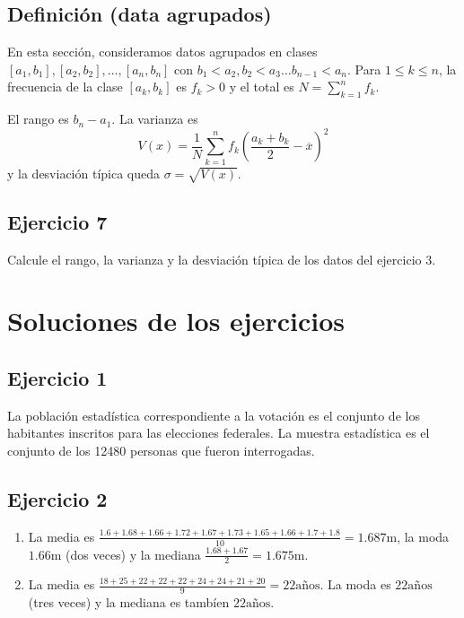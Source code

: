 \subsection{Definición (data agrupados)}

En esta sección, consideramos datos agrupados en clases
${[a_1, b_1]}, {[a_2, b_2]}, \ldots, {[a_n, b_n]}$ con
$b_1 < a_2, b_2 < a_3 \ldots b_{n-1} < a_n$. Para $1 \leq k \leq n$, la
frecuencia de la clase $[a_k, b_k]$ es $f_k > 0$ y el total es 
$N = \sum_{k=1}^n f_k$.

El rango es $b_n - a_1$. La varianza es
$$
V(x) =
\frac{1}{N}
\sum_{k=1}^n f_k \left(\frac{a_k+b_k}{2} - \overline{x}\right)^2
$$
y la desviación típica queda $\sigma = \sqrt{V(x)}$. 

\subsection{Ejercicio 7}

Calcule el rango, la varianza y la desviación típica de los datos del
ejercicio 3.

\section{Soluciones de los ejercicios}

\subsection{Ejercicio 1}

La población estadística correspondiente a la votación es el conjunto de los
habitantes inscritos para las elecciones federales. La muestra estadística
es el conjunto de los 12480 personas que fueron interrogadas.

\subsection{Ejercicio 2}

\begin{enumerate}
\item
La media es
$\frac{1.6+1.68+1.66+1.72+1.67+1.73+1.65+1.66+1.7+1.8}{10} = 1.687\text{m}$,
la moda $1.66\text{m}$ (dos veces) y la mediana
$\frac{1.68+1.67}{2} = 1.675\text{m}$.

\item
La media es $\frac{18+25+22+22+22+24+24+21+20}{9} = 22 \text{años}$.
La moda es $22 \text{años}$ (tres veces) y la mediana es tambíen $22 \text{años}$.

\end{enumerate}

